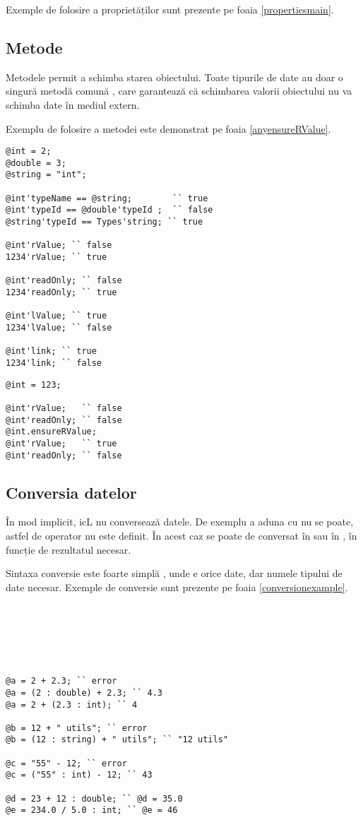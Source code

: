 Exemple de folosire a proprietăților sunt prezente pe foaia \ref{propertiesmain}.

\subsection{Metode}

Metodele permit a schimba starea obiectului. Toate tipurile de date au doar o singură metodă comună , care garantează că schimbarea valorii obiectului nu va schimba date în mediul extern.

Exemplu de folosire a metodei  este demonstrat pe foaia \ref{anyensureRValue}.

\begin{lstlisting}[caption=Proprietăți, label=propertiesmain]
@int = 2;
@double = 3;
@string = "int";

@int'typeName == @string;		 `` true
@int'typeId == @double'typeId ;	 `` false
@string'typeId == Types'string; `` true

@int'rValue; `` false
1234'rValue; `` true

@int'readOnly; `` false
1234'readOnly; `` true

@int'lValue; `` true
1234'lValue; `` false

@int'link; `` true
1234'link; `` false
\end{lstlisting}


\begin{lstlisting}[caption=Metoda any.ensureRValue, label=anyensureRValue]
@int = 123;

@int'rValue;   `` false
@int'readOnly; `` false
@int.ensureRValue;
@int'rValue;   `` true
@int'readOnly; `` false
\end{lstlisting}

\subsection{Conversia datelor}

În mod implicit, icL nu conversează datele. De exemplu a aduna \integer{} cu \double{} nu se poate, astfel de operator nu este definit. În acest caz se poate de conversat \integer{} în \double{} sau \double{} în \integer{}, în funcție de rezultatul necesar.

Sintaxa conversie este foarte simplă , unde  e orice date, dar  numele tipului de date necesar. Exemple de conversie sunt prezente pe foaia \ref{conversionexample}.

\

\

\

\begin{lstlisting}[caption=Exemple de conversie, label=conversionexample]
@a = 2 + 2.3; `` error
@a = (2 : double) + 2.3; `` 4.3
@a = 2 + (2.3 : int); `` 4

@b = 12 + " utils"; `` error
@b = (12 : string) + " utils"; `` "12 utils"

@c = "55" - 12; `` error
@c = ("55" : int) - 12; `` 43

@d = 23 + 12 : double; `` @d = 35.0
@e = 234.0 / 5.0 : int; `` @e = 46
\end{lstlisting}
